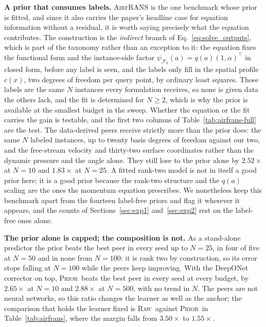 \documentclass{article}
\newcommand{\armraw}{\textsc{Raw}}
\newcommand{\armprior}{\textsc{Prior}}
\begin{document}
\textbf{A prior that consumes labels.} \textsc{AirfRANS} is the one benchmark whose
prior is fitted, and since it also carries the paper's headline case for equation
information without a residual, it is worth saying precisely what the equation
contributes. The construction is the \emph{indirect} branch of
Eq.~\ref{eq:solve_outputs}, which is part of the taxonomy rather than an exception to
it: the equation fixes the functional form and the instance-side factor
$\psi_{\mathcal{F}_0}(a)=q(a)(1,\alpha)^{\!\top}$ in closed form, before any label is
seen, and the labels only fill in the spatial profile $c(x)$, two degrees of freedom
per query point, by ordinary least squares. Those labels are the same $N$ instances
every formulation receives, so none is given data the others lack, and the fit is determined
for $N\ge2$, which is why the prior is available at the smallest budget in the sweep.
Whether the equation or the fit carries the gain is testable, and the first two
columns of Table~\ref{tab:airfrans-full} are the test. The data-derived peers receive
strictly more than the prior does: the same $N$ labeled instances, up to twenty basis
degrees of freedom against our two, and the free-stream velocity and thirty-two
surface coordinates rather than the dynamic pressure and the angle alone. They still
lose to the prior alone by $2.52\times$ at $N{=}10$ and $1.83\times$ at $N{=}25$. A fitted
rank-two model is not in itself a good prior here; it is a good prior because the
rank-two structure and the $q(a)$ scaling are the ones the momentum equation
prescribes. We nonetheless keep this benchmark apart from the fourteen label-free
priors and flag it wherever it appears, and the counts of Sections~\ref{sec:exp1}
and~\ref{sec:exp2} rest on the label-free ones alone.

\textbf{The prior alone is capped; the composition is not.} As a stand-alone
predictor the prior beats the best peer in every seed up to $N{=}25$, in four of five
at $N{=}50$ and in none from $N{=}100$: it is rank two by construction, so its error
stops falling at $N{=}100$ while the peers keep improving. With the DeepONet corrector
on top, \armprior\ beats the best peer in every seed at every budget, by $2.65\times$ at
$N{=}10$ and $2.88\times$ at $N{=}500$, with no trend in $N$. The peers are not neural
networks, so this ratio changes the learner as well as the anchor; the comparison that
holds the learner fixed is \armraw\ against \armprior\ in Table~\ref{tab:airfrans},
where the margin falls from $3.50\times$ to $1.55\times$.
\end{document}
